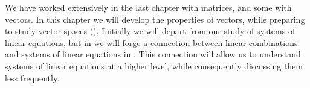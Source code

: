 \begin{para}We have worked extensively in the last chapter with matrices, and some with vectors.  In this chapter we will develop the properties of vectors, while preparing to study vector spaces ().  Initially we will depart from our study of systems of linear equations, but in  we will forge a connection between linear combinations and systems of linear equations in .  This connection will allow us to understand systems of linear equations at a higher level, while consequently discussing them less frequently.\end{para}
